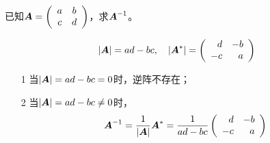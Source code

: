 \begin{frame}
\begin{li}
  已知$\boldsymbol{A} = \left(
    \begin{array}{cc}
      a & b \\
      c & d
    \end{array}
  \right)$，求$\boldsymbol{A}^{-1}$。
\end{li} \pause 

\begin{jie}
$$
|\boldsymbol{A}| = ad-bc, \quad
|\boldsymbol{A}^*| = \left(
  \begin{array}{rr}
    d & -b \\
    -c & a
  \end{array}
\right)
$$
\pause 
\begin{itemize}
\item[1] 当$|\boldsymbol{A}|=ad-bc=0$时，逆阵不存在；  \pause 
\item[2] 当$|\boldsymbol{A}|=ad-bc\ne0$时，
  $$
  \boldsymbol{A}^{-1} = \frac1{|\boldsymbol{A}|} \boldsymbol{A}^* = \frac1{ad-bc}\left(
    \begin{array}{rr}
      d & -b \\
      -c & a
    \end{array}
  \right)
  $$
\end{itemize}
\end{jie}
\end{frame}

